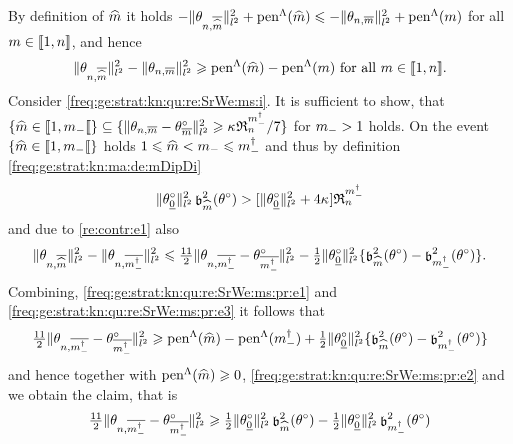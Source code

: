 \begin{pro}
  By definition of $\hDi$ it holds
  $-\Vnormlp{\txdfPr[\hDi]}^2+\penSv[\hDi]\leq
  -\Vnormlp{\txdfPr}^2+\penSv$ for all $\Di\in\nset{1,\ssY}$, and
  hence
  \begin{equation}\label{freq:ge:strat:kn:qu:re:SrWe:ms:pr:e1}
    \Vnormlp{\txdfPr[\hDi]}^2-\Vnormlp{\txdfPr}^2\geq
    \penSv[\hDi]-\penSv\text{ for all }\Di\in\nset{1,\ssY}.
  \end{equation}
  Consider \ref{freq:ge:strat:kn:qu:re:SrWe:ms:i}. It is sufficient to show, that
  $\{\hDi\in\nsetro{1,\mDi}\}\subseteq
  \{\Vnormlp{\txdfPr-\xdfPr}^2\geq\cpen\daRaS{\mdDi}{\xdf,\Lambda}/7\}$
  for $\mDi>1$ holds.  On the event $\{\hDi\in\nsetro{1,\mDi}\}$ holds
  $1\leq\hDi<\mDi\leq\mdDi$ and thus by definition
  \eqref{freq:ge:strat:kn:ma:de:mDipDi}
  \begin{equation}\label{freq:ge:strat:kn:qu:re:SrWe:ms:pr:e2}
    \Vnormlp{\xdf_{\underline{0}}}^2\bias[\hDi]^2(\xdf)>
    [\Vnormlp{\xdf_{\underline{0}}}^2+4\cpen]\daRaS{\mdDi}{\xdf,\Lambda}
  \end{equation}
  and due to  \ref{re:contr:e1} also
  \begin{equation}\label{freq:ge:strat:kn:qu:re:SrWe:ms:pr:e3}
    \Vnormlp{\txdfPr[\hDi]}^2-\Vnormlp{\txdfPr[\mdDi]}^2\leq
    \tfrac{11}{2}\Vnormlp{\txdfPr[\mdDi]-\xdfPr[\mdDi]}^2
    -\tfrac{1}{2}\Vnormlp{\xdf_{\underline{0}}}^2\{\bias[\hDi]^2(\xdf)-\bias[\mdDi]^2(\xdf)\}.
  \end{equation}
  Combining, \eqref{freq:ge:strat:kn:qu:re:SrWe:ms:pr:e1} and
  \eqref{freq:ge:strat:kn:qu:re:SrWe:ms:pr:e3} it follows that
  \begin{multline*}
    \tfrac{11}{2}\Vnormlp{\txdfPr[\mdDi]-\xdfPr[\mdDi]}^2\geq
    \penSv[\hDi]-\penSv[\mdDi]
    +\tfrac{1}{2}\Vnormlp{\xdf_{\underline{0}}}^2\{\bias[\hDi]^2(\xdf)-\bias[\mdDi]^2(\xdf)\}\hfill
  \end{multline*}
  and hence together with $\penSv[\hDi]\geq0$, \eqref{freq:ge:strat:kn:qu:re:SrWe:ms:pr:e2}
  and  we obtain the claim, that is
  \begin{multline*}
    \tfrac{11}{2}\Vnormlp{\txdfPr[\mdDi]-\xdfPr[\mdDi]}^2\geq
    \tfrac{1}{2}\Vnormlp{\xdf_{\underline{0}}}^2\bias[\hDi]^2(\xdf)-
    \tfrac{1}{2}\Vnormlp{\xdf_{\underline{0}}}^2\bias[\mdDi]^2(\xdf)

\end{multline*}
\end{pro}

